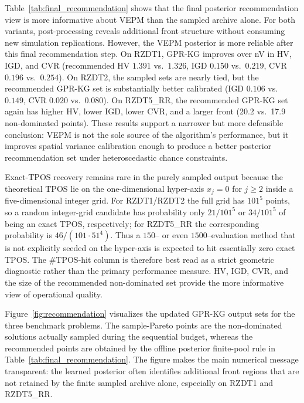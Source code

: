 \documentclass[12pt]{article}
\theoremstyle{plain}
\theoremstyle{definition}
\theoremstyle{remark}
\begin{document}
Table~\ref{tab:final_recommendation} shows that the final posterior
recommendation view is more informative about VEPM than the sampled
archive alone.  For both variants, post-processing reveals additional
front structure without consuming new simulation replications.  However,
the VEPM posterior is more reliable after this final recommendation
step.  On RZDT1, GPR-KG improves over nV in HV, IGD, and CVR
(recommended HV $1.391$ vs.\ $1.326$, IGD $0.150$ vs.\ $0.219$, CVR
$0.196$ vs.\ $0.254$).  On RZDT2, the sampled sets are nearly tied, but
the recommended GPR-KG set is substantially better calibrated
(IGD $0.106$ vs.\ $0.149$, CVR $0.020$ vs.\ $0.080$).  On RZDT5\_RR,
the recommended GPR-KG set again has higher HV, lower IGD, lower CVR,
and a larger front (20.2 vs.\ 17.9 non-dominated points).  These
results support a narrower but more defensible conclusion: VEPM is not
the sole source of the algorithm's performance, but it improves spatial
variance calibration enough to produce a better posterior
recommendation set under heteroscedastic chance constraints.

Exact-TPOS recovery remains rare in the purely sampled output because
the theoretical TPOS lie on the one-dimensional hyper-axis
$x_j=0$ for $j\ge2$ inside a five-dimensional integer grid.  For
RZDT1/RZDT2 the full grid has $101^5$ points, so a random integer-grid
candidate has probability only $21/101^5$ or $34/101^5$ of being an
exact TPOS, respectively; for RZDT5\_RR the corresponding probability
is $46/(101\cdot 51^4)$.  Thus a $150$-- or even $1500$--evaluation
method that is not explicitly seeded on the hyper-axis is expected to
hit essentially zero exact TPOS.  The $\#$TPOS-hit column is therefore
best read as a strict geometric diagnostic rather than the primary
performance measure.  HV, IGD, CVR, and the size of the recommended
non-dominated set provide the more informative view of operational
quality.

Figure~\ref{fig:recommendation} visualizes the updated GPR-KG output
sets for the three benchmark problems.  The sample-Pareto points are
the non-dominated solutions actually sampled during the sequential
budget, whereas the recommended points are obtained by the offline
posterior finite-pool rule in Table~\ref{tab:final_recommendation}.
The figure makes the main numerical message transparent: the learned
posterior often identifies additional front regions that are not
retained by the finite sampled archive alone, especially on RZDT1 and
RZDT5\_RR.
\end{document}
